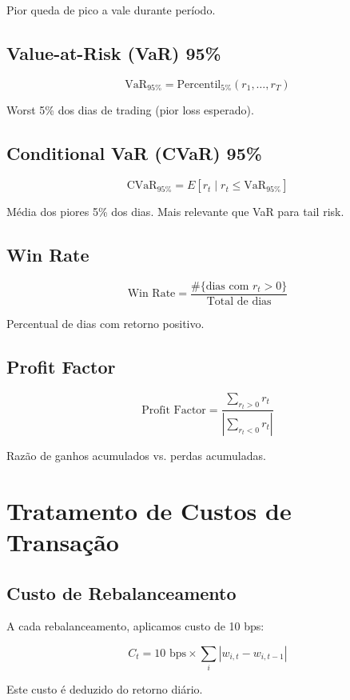 \documentclass[12pt,a4paper]{article}
\begin{document}
Pior queda de pico a vale durante período.

\subsection{Value-at-Risk (VaR) 95\%}

\[
\text{VaR}_{95\%} = \text{Percentil}_{5\%}(r_1, \ldots, r_T)
\]

Worst 5\% dos dias de trading (pior loss esperado).

\subsection{Conditional VaR (CVaR) 95\%}

\[
\text{CVaR}_{95\%} = E[r_t \mid r_t \leq \text{VaR}_{95\%}]
\]

Média dos piores 5\% dos dias. Mais relevante que VaR para tail risk.

\subsection{Win Rate}

\[
\text{Win Rate} = \frac{\#\{\text{dias com } r_t > 0\}}{\text{Total de dias}}
\]

Percentual de dias com retorno positivo.

\subsection{Profit Factor}

\[
\text{Profit Factor} = \frac{\sum_{r_t > 0} r_t}{|\sum_{r_t < 0} r_t|}
\]

Razão de ganhos acumulados vs. perdas acumuladas.

\section{Tratamento de Custos de Transação}

\subsection{Custo de Rebalanceamento}

A cada rebalanceamento, aplicamos custo de 10 bps:

\[
C_t = 10 \text{ bps} \times \sum_i |w_{i,t} - w_{i,t-1}|
\]

Este custo é deduzido do retorno diário.
\end{document}

